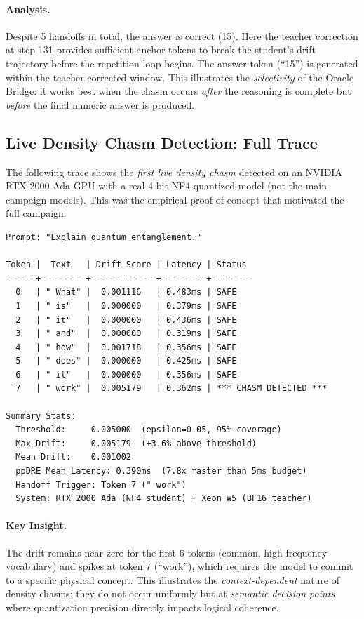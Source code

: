 \documentclass[twoside]{article}
\begin{document}
\paragraph{Analysis.} Despite 5 handoffs in total, the answer is correct (15). Here the teacher correction at step 131 provides sufficient anchor tokens to break the student's drift trajectory before the repetition loop begins. The answer token (``15'') is generated within the teacher-corrected window. This illustrates the \emph{selectivity} of the Oracle Bridge: it works best when the chasm occurs \emph{after} the reasoning is complete but \emph{before} the final numeric answer is produced.

\subsection{Live Density Chasm Detection: Full Trace}
\label{app:live_trace}

The following trace shows the \emph{first live density chasm} detected on an NVIDIA RTX 2000 Ada GPU with a real 4-bit NF4-quantized model (not the main campaign models). This was the empirical proof-of-concept that motivated the full campaign.

\begin{lstlisting}[caption={Live Chasm Detection -- Full Token-Level Drift Trace}]
Prompt: "Explain quantum entanglement."

Token |  Text   | Drift Score | Latency | Status
------+---------+-------------+---------+--------
  0   | " What" |  0.001116   | 0.483ms | SAFE
  1   | " is"   |  0.000000   | 0.379ms | SAFE
  2   | " it"   |  0.000000   | 0.436ms | SAFE
  3   | " and"  |  0.000000   | 0.319ms | SAFE
  4   | " how"  |  0.001718   | 0.356ms | SAFE
  5   | " does" |  0.000000   | 0.425ms | SAFE
  6   | " it"   |  0.000000   | 0.356ms | SAFE
  7   | " work" |  0.005179   | 0.362ms | *** CHASM DETECTED ***

Summary Stats:
  Threshold:     0.005000  (epsilon=0.05, 95% coverage)
  Max Drift:     0.005179  (+3.6% above threshold)
  Mean Drift:    0.001002
  ppDRE Mean Latency: 0.390ms  (7.8x faster than 5ms budget)
  Handoff Trigger: Token 7 (" work")
  System: RTX 2000 Ada (NF4 student) + Xeon W5 (BF16 teacher)
\end{lstlisting}

\paragraph{Key Insight.} The drift remains near zero for the first 6 tokens (common, high-frequency vocabulary) and spikes at token 7 (``work''), which requires the model to commit to a specific physical concept. This illustrates the \emph{context-dependent} nature of density chasms: they do not occur uniformly but at \emph{semantic decision points} where quantization precision directly impacts logical coherence.
\end{document}
